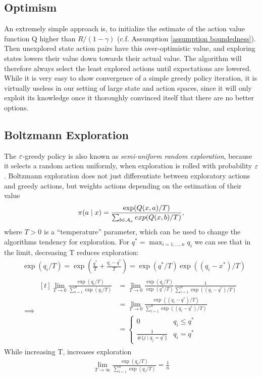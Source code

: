 \subsection{Optimism}
An extremely simple approach is, to initialize the estimate of the action value function Q higher than \(R/(1-\gamma)\) (c.f. Assumption \ref{assumption boundedness}). Then unexplored state action pairs have this over-optimistic value, and exploring states lowers their value down towards their actual value. The algorithm will therefore always select the least explored actions until expectations are lowered.  While it is very easy to show convergence of a simple greedy policy iteration, it is virtually useless in our setting of large state and action spaces, since it will only exploit its knowledge once it thoroughly convinced itself that there are no better options. 

\subsection{Boltzmann Exploration}
The \(\varepsilon\)-greedy policy is also known as \emph{semi-uniform random exploration}, because it selects a random action uniformly, when exploration is rolled with probability \(\varepsilon\). Boltzmann exploration does not just differentiate between exploratory actions and greedy actions, but weights actions depending on the estimation of their value
\[
	\pi(a\mid x) = \frac{\exp(Q(x,a)/T)}{\sum_{b\in\mathcal{A}_x} exp(Q(x,b)/T)},
\]
where \(T>0\) is a ``temperature'' parameter, which can be used to change the algorithms tendency for exploration. For \(q^*=\max_{i=1,\dots,n} q_i\) we can see that in the limit, decreasing T reduces exploration:
\begin{align*}
	&\exp(q_i/T)=\exp\left(\frac{q^*}{T}+ \frac{q_i-q^*}{T}\right)= \exp(q^*/T)\exp((q_i-x^*)/T)\\
	&\implies\begin{aligned}[t]
		\lim_{T\to 0}\frac{\exp(q_i/T)}{\sum_{i=1}^n \exp(q_i/T)}
	&= \lim_{T\to 0} \frac{\exp(q_i/T)}{\exp(q^*/T)}
	\frac{1}{\sum_{i=1}^n\exp((q_i-q^*)/T)}\\
	&= \lim_{T\to 0} \frac{\exp((q_i-q^*)/T)}{\sum_{i=1}^n\exp((q_i-q^*)/T)}\\
	&=\begin{cases}
		0 & q_i \le q^*\\
		\frac{1}{\# \{j \mid  q_j=q^* \}} &q_i=q^*
	\end{cases}
	\end{aligned}
\end{align*}
While increasing T, increases exploration
\begin{align*}
	\lim_{T\to \infty}\frac{\exp(q_i/T)}{\sum_{i=1}^n \exp(q_i/T)}= \frac{1}{n}
\end{align*}


